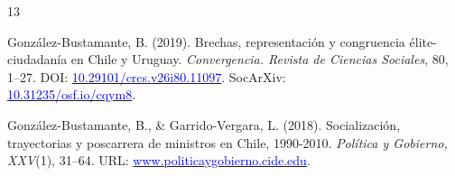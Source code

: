 \begin{publications}
\begin{benumerate}{13}
\item{González-Bustamante, B. (2019). Brechas, representación y congruencia élite-ciudadanía en Chile y Uruguay. {\itshape Convergencia. Revista de Ciencias Sociales}, 80, 1--27. DOI: \href{https://doi.org/10.29101/crcs.v26i80.11097}{\textcolor{blue}{10.29101/crcs.v26i80.11097}}. SocArXiv: \\ \href{https://doi.org/10.31235/osf.io/cqym8}{\textcolor{blue}{10.31235/osf.io/cqym8}}.}\vspace{1mm} %

\item{González-Bustamante, B., \& Garrido-Vergara, L. (2018). Socialización, trayectorias y poscarrera de ministros en Chile, 1990-2010. {\itshape Política y Gobierno, XXV}(1), 31--64. URL: \href{http://www.politicaygobierno.cide.edu/index.php/pyg/article/view/1080}{\textcolor{blue}{www.politicaygobierno.cide.edu}}.}\vspace{1mm}

\end{benumerate}

\end{publications}


